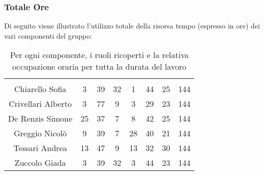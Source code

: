 \subsubsection{Totale Ore}
Di seguito viene illustrato l'utilizzo totale della risorsa tempo (espresso in ore) dei vari componenti del gruppo:

\begin{table}[H]
	\begin{center}
		\begin{tabular}{c
				!{\color[HTML]{9b240a}\vrule width 1pt}
				cccccc
				!{\color[HTML]{9b240a}\vrule width 1pt}	
				c}
			\rowcolorhead
			 &  &  &  &  &  &  &  \\
			
			Chiarello Sofia & 3 & 39 & 32 & 1 & 44 & 25 & 144\\
			Crivellari Alberto & 3 & 77 & 9 & 3 & 29 & 23 & 144\\
			De Renzis Simone & 25 & 37 & 7 & 8 & 42 & 25 & 144\\
			Greggio Nicolò & 9 & 39 & 7 & 28 & 40 & 21 & 144\\
			Tessari Andrea & 13 & 47 & 9 & 13 & 32 & 30 & 144\\
			Zuccolo Giada & 3 & 39 & 32 & 3 & 44 & 23 & 144\\
		\end{tabular}
		\caption[Occupazione oraria totale]{Per ogni componente, i ruoli ricoperti e la relativa occupazione oraria per tutta la durata del lavoro}
	\end{center}
\end{table}



